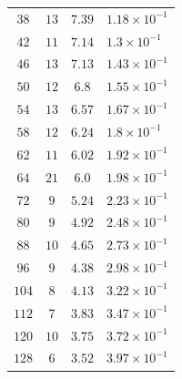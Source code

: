 \documentclass[11pt,a4paper,twoside,
openright]{book}
\begin{document}
\begin{table}
\begin{tabular}{|c | c | c | l |}
			$38$ & $13$ & $7.39$ & $1.18\times 10^{-1}$ \\ 
			$42$ & $11$ & $7.14$ & $1.3\times 10^{-1}$ \\ 
			$46$ & $13$ & $7.13$ & $1.43\times 10^{-1}$ \\ 
			$50$ & $12$ & $6.8$ & $1.55\times 10^{-1}$ \\ 
			$54$ & $13$ & $6.57$ & $1.67\times 10^{-1}$ \\ 
			$58$ & $12$ & $6.24$ & $1.8\times 10^{-1}$ \\ 
			$62$ & $11$ & $6.02$ & $1.92\times 10^{-1}$ \\ 
			$64$ & $21$ & $6.0$ & $1.98\times 10^{-1}$ \\ 
			$72$ & $9$ & $5.24$ & $2.23\times 10^{-1}$ \\ 
			$80$ & $9$ & $4.92$ & $2.48\times 10^{-1}$ \\ 
			$88$ & $10$ & $4.65$ & $2.73\times 10^{-1}$ \\ 
			$96$ & $9$ & $4.38$ & $2.98\times 10^{-1}$ \\ 
			$104$ & $8$ & $4.13$ & $3.22\times 10^{-1}$ \\ 
			$112$ & $7$ & $3.83$ & $3.47\times 10^{-1}$ \\ 
			$120$ & $10$ & $3.75$ & $3.72\times 10^{-1}$ \\ 
			$128$ & $6$ & $3.52$ & $3.97\times 10^{-1}$ \\  
			\hline  
		\end{tabular}
	\end{table}
	\vspace*{0.5 cm}
\end{document}
